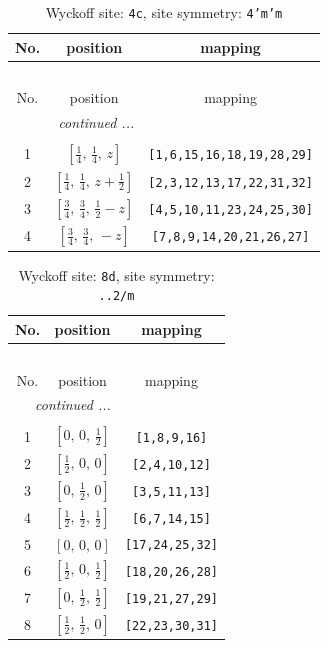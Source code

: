 \documentclass[fleqn,8pt]{jsarticle}
\begin{document}
\renewcommand{\arraystretch}{1.2}
\begin{longtable}{ccc}
\caption{Wyckoff site: {\tt 4c}, site symmetry: {\tt 4'm'm}}
 \\
 \hline \hline
No. & position & mapping \\ \hline \endfirsthead

\multicolumn{2}{l}{\tablename\ \thetable{}} \\
 \hline \hline
No. & position & mapping \\ \hline \endhead

 \hline \hline
\multicolumn{2}{r}{\footnotesize\it continued ...} \\ \endfoot

 \hline \hline
\multicolumn{2}{r}{} \\ \endlastfoot

1 & $\left[ \frac{1}{4},\, \frac{1}{4},\, z \right]$ & {\tt [1,6,15,16,18,19,28,29]} \\ \hline
2 & $\left[ \frac{1}{4},\, \frac{1}{4},\, z + \frac{1}{2} \right]$ & {\tt [2,3,12,13,17,22,31,32]} \\ \hline
3 & $\left[ \frac{3}{4},\, \frac{3}{4},\, \frac{1}{2} - z \right]$ & {\tt [4,5,10,11,23,24,25,30]} \\ \hline
4 & $\left[ \frac{3}{4},\, \frac{3}{4},\, - z \right]$ & {\tt [7,8,9,14,20,21,26,27]} \\
\end{longtable}
\renewcommand{\arraystretch}{1.2}
\begin{longtable}{ccc}
\caption{Wyckoff site: {\tt 8d}, site symmetry: {\tt ..2/m}}
 \\
 \hline \hline
No. & position & mapping \\ \hline \endfirsthead

\multicolumn{2}{l}{\tablename\ \thetable{}} \\
 \hline \hline
No. & position & mapping \\ \hline \endhead

 \hline \hline
\multicolumn{2}{r}{\footnotesize\it continued ...} \\ \endfoot

 \hline \hline
\multicolumn{2}{r}{} \\ \endlastfoot

1 & $\left[ 0,\, 0,\, \frac{1}{2} \right]$ & {\tt [1,8,9,16]} \\ \hline
2 & $\left[ \frac{1}{2},\, 0,\, 0 \right]$ & {\tt [2,4,10,12]} \\ \hline
3 & $\left[ 0,\, \frac{1}{2},\, 0 \right]$ & {\tt [3,5,11,13]} \\ \hline
4 & $\left[ \frac{1}{2},\, \frac{1}{2},\, \frac{1}{2} \right]$ & {\tt [6,7,14,15]} \\ \hline
5 & $\left[ 0,\, 0,\, 0 \right]$ & {\tt [17,24,25,32]} \\ \hline
6 & $\left[ \frac{1}{2},\, 0,\, \frac{1}{2} \right]$ & {\tt [18,20,26,28]} \\ \hline
7 & $\left[ 0,\, \frac{1}{2},\, \frac{1}{2} \right]$ & {\tt [19,21,27,29]} \\ \hline
8 & $\left[ \frac{1}{2},\, \frac{1}{2},\, 0 \right]$ & {\tt [22,23,30,31]} \\
\end{longtable}
\end{document}
